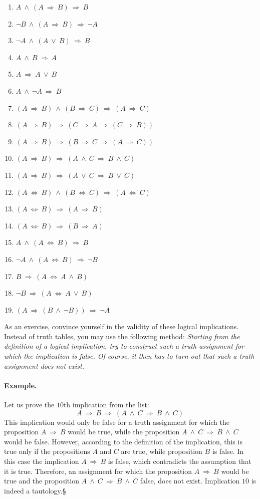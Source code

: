 \documentclass[11pt,paper=b5,footinclude,headinclude]{scrbook} %
\def\ali {{~\vee~}}
\def\inn {{~\wedge~}}
\def\sledi {{~\Rightarrow~}}
\def\cee {{~\Leftrightarrow~}}
\def\kz{{\hfill{\S}}}%
\theoremstyle{remark}
\theoremstyle{definition} %
\begin{document}
\begin{enumerate}
	\item $A \inn (A \sledi B) \sledi B$
	\item $\neg B \inn (A \sledi B) \sledi \neg A$
	\item $\neg A \inn (A \ali B) \sledi B$
	\item $A \inn B \sledi A$
	\item $A \sledi A\ali B$
	\item $A \inn \neg A\sledi B$
	\item $(A \sledi B) \inn (B \sledi C) \sledi (A\sledi C)$
	\item $(A \sledi B) \sledi (C \sledi A \sledi (C\sledi B))$
	\item $(A \sledi B) \sledi (B \sledi C \sledi (A\sledi C))$
	\item $(A \sledi B) \sledi (A\inn C \sledi B\inn C)$
	\item $(A \sledi B) \sledi (A\ali C \sledi B\ali C)$
	\item $(A \cee B) \inn (B\cee C) \sledi (A\cee C)$
	\item $(A \cee B) \sledi (A\sledi B)$
	\item $(A \cee B) \sledi (B\sledi A)$
	\item $A \inn (A \cee B) \sledi B$
	\item $\neg A \inn (A \cee B) \sledi \neg B$
	\item $B\sledi (A\cee A \inn B)$
	\item $\neg B\sledi (A\cee A \ali B)$
	\item $(A\sledi (B\inn \neg B)) \sledi \neg A$
\end{enumerate}

As an exercise, convince yourself in the validity of these logical implications.
Instead of truth tables, you may use the following method: {\em Starting from the definition of a logical implication, try to construct such a truth assignment for which the implication is false. Of course, it then has to turn out that such a truth assignment does not exist.}

\bigskip
\paragraph{Example.}
Let us prove the $10$th implication from the list:
$$A \sledi B \sledi (A\inn C \sledi B\inn C)$$
This implication would only be false for a truth assignment for which the proposition
$A \sledi B$ would be true, while the proposition $A\inn C \sledi B\inn C$ would be false.
However, according to the definition of the implication, this is true only if the propositions
$A$ and $C$ are true, while proposition $B$ is false.
In this case the implication $A \sledi B$ is false, which contradicts the assumption that it is true.
Therefore, an assignment for which the proposition $A \sledi B$ would be true and the proposition $A\inn C \sledi B\inn C$ false, does not exist.
Implication $10$ is indeed a tautology.\kz
\medskip
\end{document}
